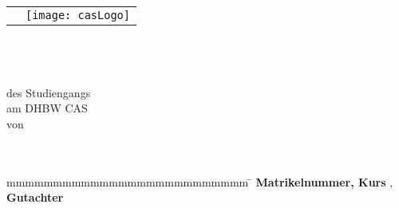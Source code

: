 \begin{titlepage}
	\begin{longtable}{p{8.2cm} p{5.4cm}}
		&
		\texttt{[image: casLogo]}
	\end{longtable}
	\addtocounter{table}{-1}
	\enlargethispage{20mm}
	\begin{center}
		\vspace*{12mm}	{\LARGE\textbf \myTitel }\\
		\vspace*{12mm}	{\large\textbf \myArbeit}\\
		\vspace*{3mm}		{\textbf \myDegree}\\
		\vspace*{12mm}	des Studiengangs \myKurs\\
    \vspace*{3mm}		am DHBW CAS\\
		\vspace*{12mm}	von\\
		\vspace*{3mm}		{\large\textbf \myAutor}\\
		\vspace*{12mm}	\myDatum\\
	\end{center}
	\vfill
	\begin{spacing}{1.2}
	\begin{tabbing}
		mmmmmmmmmmmmmmmmmmmmmmmmmm             \= \kill
		\textbf{Matrikelnummer, Kurs}  \>  \myMatrikelnr, \myKurs\\
		\textbf{Gutachter}              \>  \myGutachter
	\end{tabbing}
	\end{spacing}
\end{titlepage}
